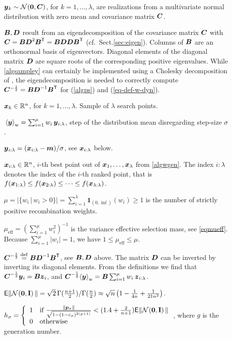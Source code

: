 \documentclass{article} %
\newcommand{\tutorial}[1]{{#1}}
\newcommand{\R}{\mathbb{R}}
\newcommand{\kom}[1]{}
\newcommand{\where}[1]{%
  \begin{description}
  \item[]#1 \vspace{-0.9ex}
  \end{description}
}
\newcommand{\ve}[1]{\mathchoice{\mbox{\boldmath$\displaystyle#1$}}
  {\mbox{\boldmath$\textstyle#1$}} {\mbox{\boldmath$\scriptstyle#1$}}
  {\mbox{\boldmath$\scriptscriptstyle#1$}}}
\newcommand{\ma}[1]{\mathchoice{\mbox{\boldmath$\displaystyle#1$}}
  {\mbox{\boldmath$\textstyle#1$}} {\mbox{\boldmath$\scriptstyle#1$}}
  {\mbox{\boldmath$\scriptscriptstyle#1$}}}
\newcommand{\T}{\ensuremath{\mathsf{T}}}
\newcommand{\N}{\ensuremath{n}}
\newcommand{\Rn}{\R^{\N}}
\newcommand{\rklam}[1]{\left({#1}\right)}
\newcommand{\mueff}{\ensuremath{\mu_\mathrm{eff}}}
\newcommand{\summ}[2]{\sum_{#1=1}^{#2}}
\newcommand{\lam}{\ensuremath{\lambda}}
\newcommand{\sig}{\ensuremath{\sigma}}
\newcommand{\pcgg}{\ve{p}_\mathrm{c}^{(g+1)}}
\newcommand{\cs}{c_\sig}
\newcommand{\ps}{\ve{p}_\sig}
\newcommand{\x}{\ve{x}}
\newcommand{\y}{\ve{y}}
\newcommand{\z}{\ve{z}}
\newcommand{\ilam}{{i:\lam}}
\newcommand{\Normal}[1]{{\mathcal N}\hspace{-0.13em}\left(#1\right)}
\newcommand{\Id}{\mathbf{I}}
\newcommand{\NormalNullI}{{\mathcal N}
        \hspace{-0.13em}\left({\ve{0},\Id}\right)}
\newcommand{\chiN}{\mathsf{E}\|\NormalNullI\|}
\newcommand{\xmean}{\ensuremath{\ve{m}}}
\newcommand{\pref}[1]{\mbox{.\hspace{0.235em}\ref{#1}}}
\newcommand{\eqrefadd}[1]{(\ref{#1})} %
\newcommand{\eqsref}[1]{(\ref{#1})}
\begin{document}
\begin{appendix}
\begin{figure}
\end{figure}%
%
\where{$\y_k\sim\Normal{\ve{0},\ma{C}}$, for $k=1,\dots,\lam$, are
   realizations from a multivariate normal distribution with
   zero mean and covariance matrix $\ma{C}$.  }
%
\where{$\B,\D$ result from an eigendecomposition of the
   covariance matrix $\C$ with
   $\C=\B{\D}^2{\B}^\T=\B{\D}{\D}{\B}^\T$\tutorial{ (cf.\
   Sect\pref{sec:eigen})}.  Columns of $\B$ are an orthonormal basis
   of eigenvectors.  Diagonal elements of the diagonal matrix $\D$ are
   square roots of the corresponding positive eigenvalues. While
   \eqref{algsampley} can certainly be implemented using a Cholesky
   decomposition of \C, the eigendecomposition is needed to correctly 
   compute $\C^{-\frac{1}{2}} = \B{\D}^{-1}{\B}^\T$ for \eqsref{algps} 
   and \eqrefadd{eq-def-w-dyn}.  }
%
\where{$\x_k\in\Rn$, for $k=1,\dots,\lam$. Sample of $\lam$ search
   points. }
%
%
\where{$\ymean = \summ{i}{\mu}w_i\,\y_\ilam$, step of the
  distribution mean disregarding step-size $\sig$. }
%
\where{$\y_\ilam = (\x_\ilam-\xmean)/\sig$, see $\x_\ilam$ below.}
%
\where{$\x_\ilam\in\Rn$, $i$-th best point out of
  $\x_1,\dots,\x_\lam$ from \eqref{algwgen}. The index
  \mbox{$\ilam$} denotes the index of the $i$-th ranked point, that
  is $f(\x_{1:\lam})\le f(\x_{2:\lam})\le\dots\le
  f(\x_{\lam:\lam})$.}
%
\kom{\where{$\ps\in\Rn$ evolution  path for $\sig$. }}%
%
\where{$
\mu 
    = \left|\{w_i\,|\, w_i > 0\}\right|
    = \summ{i}{\lam} \mathbf{1}_{(0, \inf)}(w_i) \ge 1$ 
  is the number of strictly positive recombination weights.
}
%
\where{$\mueff = \rklam{\summ{i}{\mu}w_i^2}^{-1}$ is the variance
  effective selection mass, see \eqref{eqmueff}. Because $\summ{i}{\mu}|w_i| = 1$, we have
  $1\le\mueff\le\mu$.}
%
\where{${\C}^{-\frac{1}{2}} \stackrel{\mathrm{def}}{=} \B{\D}^{-1}{\B}^\T$,
  see $\B,\D$ above. The matrix $\D$ can be inverted by inverting
  its diagonal elements.  From the definitions we find that
  ${\C}^{-\frac{1}{2}}\y_i = \B\z_i$, and
  ${\C}^{-\frac{1}{2}}\!\ymean = \B %
  \summ{i}{\mu}w_i\,\z_\ilam$.  }
%
\where{$\chiN=\sqrt{2}\,
  \mathrm{\Gamma}(\frac{n+1}{2})/\mathrm{\Gamma}(\frac{n}{2})
  \approx\sqrt{\N}\rklam{1-\frac{1}{4\N}+\frac{1}{21\N^2}}$.}
%
\kom{\where{$\pcgg\in\Rn$, evolution path for $\ma{C}$. }}
%
\where{$\Hsig=\left\{
    \begin{array}{ll}
      1 &\mbox{if }\frac{\|\ps\|}{\sqrt{1-(1-\cs)^{2(g+1)}}} < (1.4 + \frac{2}{\N+1})\chiN\\
      0 &\mbox{otherwise}
    \end{array}\right.$, where $g$ is the generation number. 
}
\end{appendix}
\end{document}
